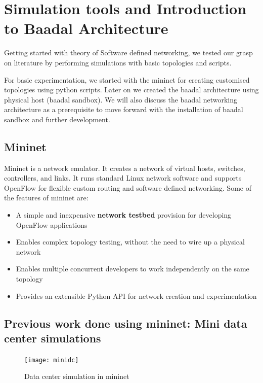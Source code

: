 \chapter{Simulation tools and Introduction to Baadal Architecture}

Getting started with theory of Software defined networking, we tested our grasp on literature by performing simulations with basic topologies and scripts. 

For basic experimentation, we started with the mininet for creating customised topologies using python scripts. Later on we created the baadal architecture using physical host (baadal sandbox).
We will also discuss the baadal networking architecture as a prerequisite to move forward with the installation of baadal sandbox and further development.

\section{Mininet}

Mininet is a network emulator. It creates a network of virtual hosts, switches, controllers, and links. It runs standard Linux network software and supports OpenFlow for flexible custom routing and software defined networking. Some of the features of mininet are: 
\begin{itemize}
    \item A simple and inexpensive \textbf{network testbed} provision for developing OpenFlow applications
    \item Enables complex topology testing, without the need to wire up a physical network
    \item Enables multiple concurrent developers to work independently on the same topology
    \item Provides an extensible Python API for network creation and experimentation
\end{itemize}

\section{Previous work done using mininet: Mini data center simulations}

\begin{figure}[h]
\begin{center}	
\texttt{[image: minidc]} 
\caption{Data center simulation in mininet}
\label{fig:minidc}
\end{center}
\end{figure}


